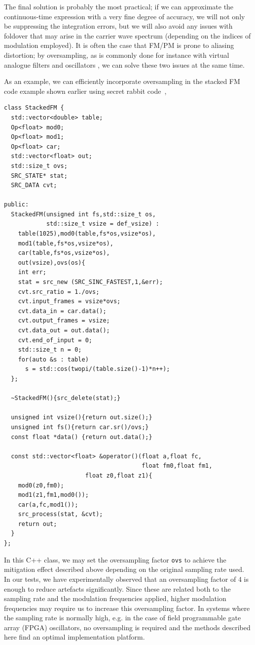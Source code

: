\documentclass[]{interact}
\begin{document}
The final solution is probably the most practical; if we can approximate the continuous-time expression with a very fine degree of accuracy, we will not only be suppressing the integration errors, but we will also avoid any issues with foldover that may arise in the carrier wave spectrum (depending on the indices of modulation employed). It is often the case that FM/PM is prone to aliasing distortion; by oversampling, as is commonly done for instance with virtual analogue filters and oscillators \citep{VAreview}, we can solve these two issues at the same time. 

As an example, we can efficiently incorporate oversampling in the stacked FM code example shown earlier
using secret rabbit code~\citep{libsrc}, 

\begin{lstlisting}
class StackedFM {
  std::vector<double> table;
  Op<float> mod0; 
  Op<float> mod1;
  Op<float> car;
  std::vector<float> out;
  std::size_t ovs;
  SRC_STATE* stat;
  SRC_DATA cvt;
  
public:
  StackedFM(unsigned int fs,std::size_t os,
            std::size_t vsize = def_vsize) :
    table(1025),mod0(table,fs*os,vsize*os),
    mod1(table,fs*os,vsize*os),
    car(table,fs*os,vsize*os),
    out(vsize),ovs(os){
    int err;
    stat = src_new (SRC_SINC_FASTEST,1,&err);
    cvt.src_ratio = 1./ovs;
    cvt.input_frames = vsize*ovs;
    cvt.data_in = car.data();
    cvt.output_frames = vsize;
    cvt.data_out = out.data();
    cvt.end_of_input = 0;
    std::size_t n = 0;
    for(auto &s : table)
      s = std::cos(twopi/(table.size()-1)*n++);
  };

  ~StackedFM(){src_delete(stat);}

  unsigned int vsize(){return out.size();}
  unsigned int fs(){return car.sr()/ovs;}
  const float *data() {return out.data();}

  const std::vector<float> &operator()(float a,float fc,
                                       float fm0,float fm1,
				       float z0,float z1){
    mod0(z0,fm0);
    mod1(z1,fm1,mod0());
    car(a,fc,mod1());
    src_process(stat, &cvt);
    return out;
  }
};
\end{lstlisting}

In this C++ class, we may set the oversampling factor \lstinline{ovs} to achieve the 
mitigation effect described above depending on the original sampling rate used. In our tests, we have
experimentally observed that an oversampling factor of 4 is enough to reduce artefacts significantly.
Since these are related both to the sampling rate and the modulation frequencies applied, higher
modulation frequencies may require us to increase this oversampling factor. In systems where the
sampling rate is normally high, e.g. in the case of field programmable gate array (FPGA) oscillators, no oversampling is required and the methods described here find an optimal implementation platform.
\end{document}
